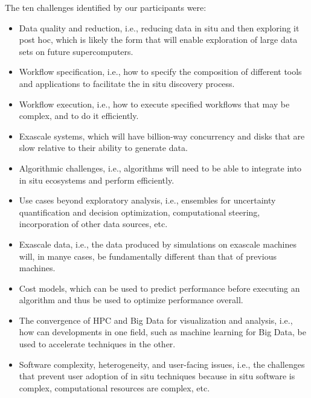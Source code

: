 The ten challenges identified by our participants were:
\begin{itemize}
    \item Data quality and reduction, i.e., reducing data in situ and then exploring it post hoc, which is likely the form that will enable exploration of large data sets on future supercomputers.
    \item Workflow specification, i.e., how to specify the composition of different tools and applications to facilitate the in situ discovery process.
    \item Workflow execution, i.e., how to execute specified workflows that may be complex, and to do it efficiently.
    \item Exascale systems, which will have billion-way concurrency and disks that are slow relative to their ability to generate data.
    \item Algorithmic challenges, i.e., algorithms will need to be able to integrate into in situ ecosystems and perform efficiently.
    \item Use cases beyond exploratory analysis, i.e., ensembles for uncertainty quantification and decision optimization, computational steering, incorporation of other data sources, etc.
    \item Exascale data, i.e., the data produced by simulations on exascale machines will, in manye cases, be fundamentally different than that of previous machines.
    \item Cost models, which can be used to predict performance before executing an algorithm and thus be used to optimize performance overall.
    \item The convergence of HPC and Big Data for visualization and analysis, i.e., how can developments in one field, such as machine learning for Big Data, be used to accelerate techniques in the other. 
    \item Software complexity, heterogeneity, and user-facing issues, i.e., the challenges that prevent user adoption of in situ techniques because in situ software is complex, computational resources are complex, etc.
\end{itemize}